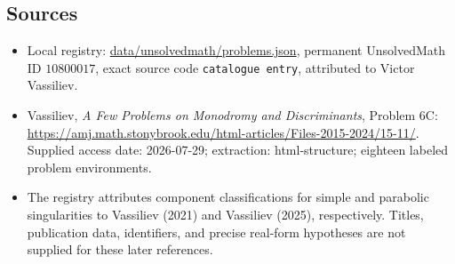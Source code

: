 \documentclass[11pt]{article}
\begin{document}
\subsection{Sources}
\begin{itemize}
\item Local registry: \url{data/unsolvedmath/problems.json}, permanent UnsolvedMath ID $10800017$, exact source code \texttt{catalogue entry}, attributed to Victor Vassiliev.
\item Vassiliev, \emph{A Few Problems on Monodromy and Discriminants}, Problem 6C: \url{https://amj.math.stonybrook.edu/html-articles/Files-2015-2024/15-11/}. Supplied access date: 2026-07-29; extraction: html-structure; eighteen labeled problem environments.
\item The registry attributes component classifications for simple and parabolic singularities to Vassiliev (2021) and Vassiliev (2025), respectively. Titles, publication data, identifiers, and precise real-form hypotheses are not supplied for these later references.
\end{itemize}
\end{document}
